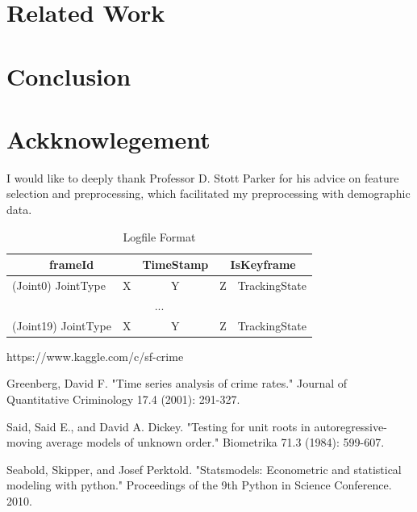 \documentclass[11pt,conference]{IEEEtran}
\begin{document}
\section{Related Work}

\section{Conclusion}

\section{Ackknowlegement}
I would like to deeply thank Professor D. Stott Parker for his advice on feature selection and preprocessing, which facilitated my preprocessing with demographic data. 


\begin{table}[h]
\caption{Logfile Format}\centering
\begin{tabular}{|l|l|c|l|l|}
\hline
\multicolumn{2}{|c|}{frameId} & \multicolumn{1}{l|}{TimeStamp} & \multicolumn{2}{c|}{IsKeyframe} \\ \hline
(Joint0) JointType     & X    & Y                              & Z        & TrackingState        \\ \hline
\multicolumn{5}{|c|}{...}                                                                        \\ \hline
(Joint19) JointType    & X    & Y                              & Z        & TrackingState        \\ \hline
\end{tabular}
\end{table}

\begin{thebibliography}{1}

https://www.kaggle.com/c/sf-crime

Greenberg, David F. "Time series analysis of crime rates." Journal of Quantitative Criminology 17.4 (2001): 291-327.

Said, Said E., and David A. Dickey. "Testing for unit roots in autoregressive-moving average models of unknown order." Biometrika 71.3 (1984): 599-607.

Seabold, Skipper, and Josef Perktold. "Statsmodels: Econometric and statistical modeling with python." Proceedings of the 9th Python in Science Conference. 2010.

\end{thebibliography}
\end{document}
